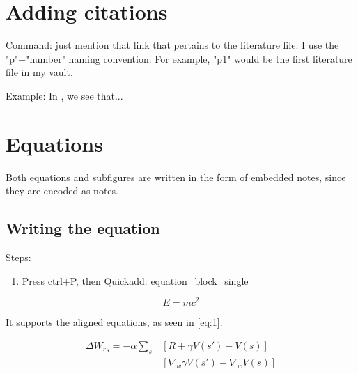 \documentclass{article}
\begin{document}
\section{Adding citations} \label{sec:Adding-citations}

Command: just mention that link that pertains to the literature file. I use the "p"+"number" naming convention. For example, "p1" would be the first literature file in my vault.



Example: In \cite{p1}, we see that...  \hypertarget{ad3b86}{} \label{ead3b86}



\section{Equations}

Both equations and subfigures are written in the form of embedded notes, since they are encoded as notes.

\subsection{Writing the equation}



Steps:



\begin{enumerate}
\item Press ctrl+P, then Quickadd: equation\_block\_single
\end{enumerate}



\begin{equation} \label{eq:Einstein}
	E=mc^{2}
\end{equation}





It supports the aligned equations, as seen in \cref{eq:1}.




\begin{equation}\label{eq:1}
\begin{aligned}
\Delta W_{rg} = -\alpha \sum_{s}&[R+\gamma V(s')-V(s)]  \\
&[\nabla_{w} \gamma V(s')-\nabla_{w}V(s)]
\end{aligned}
\end{equation}
\end{document}
